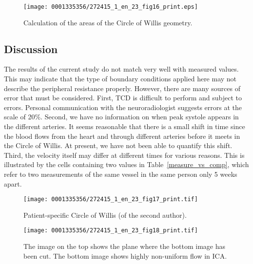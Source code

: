 \begin{figure}[!t]
\centering
\texttt{[image: 0001335356/272415\_1\_en\_23\_fig16\_print.eps]}
\caption{Calculation of the areas of the Circle of Willis geometry.}
\label{fig:kvs-2:area_code}
\end{figure}

\subsection{Discussion}

The results of the current study do not match very well with measured
values. This may indicate that the type of boundary conditions applied
here may not describe the peripheral resistance properly. However,
there are many sources of error that must be considered.  First, TCD
is difficult to perform and subject to errors. Personal communication
with the neuroradiologist suggests errors at the scale of 20\%.
Second, we have no information on when peak systole appears in the
different arteries. It seems reasonable that there is a small shift in
time since the blood flows from the heart and through different
arteries before it meets in the Circle of Willis. At present, we have not been able to
quantify this shift. Third, the velocity itself may differ at
different times for various reasons. This is illustrated by the cells
containing two values in Table~\ref{measure_vs_comp}, which refer to
two measurements of the same vessel in the same person only 5 weeks
apart.


\begin{figure}[!t]
\centering
\texttt{[image: 0001335356/272415\_1\_en\_23\_fig17\_print.tif]}
\caption{Patient-specific Circle of Willis (of the second author).}
\label{fig:kvs-2:screenshot}%
\end{figure}

\begin{figure}[!t]
\centering
\texttt{[image: 0001335356/272415\_1\_en\_23\_fig18\_print.tif]}
\caption{The image on the top shows the plane where the bottom
image has been cut. The bottom image shows highly
non-uniform flow in ICA.}\label{fig:kvs-2:cok_ica}\vspace*{-8pt}
\end{figure}


